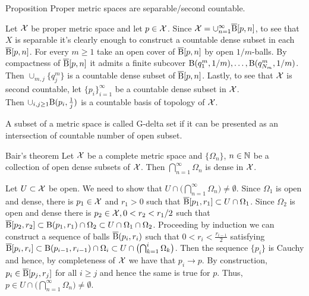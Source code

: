 \begin{thm}{Proposition}
Proper metric spaces are separable/second countable.
\end{thm}
Let $\mathcal{X}$ be  proper metric space and let $p\in \spc{X}$. Since $\spc{X}=\cup_{n=1}^\infty\cBall[p,n]$, to see that $X$ is separable it's clearly enough to construct a countable dense subset in  each $\overline{\mathrm{B}}{}[p,n]$. For every $m\ge 1$  take  an open cover of $\overline{\mathrm{B}}{}[p,n]$ by open $1/m$-balls. By compactness of $\overline{\mathrm{B}}{}[p,n]$ it admits a finite subcover $\mathrm{B}{}(q^m_1,1/m),\ldots, \mathrm{B}{}(q^m_{N_m},1/m)$. Then $\cup_{m, j} \{q^m_j\}$ is a countable dense subset of $\overline{\mathrm{B}}{}[p,n]$.
Lastly, to see that $\mathcal{X}$ is second countable, let $\{p_i\}_{i=1}^\infty$ be a countable dense subset in $\mathcal{X}$. \\ Then $\cup_{i,j\ge 1} \oBall(p_i,\frac 1 j)$ is a countable basis of topology of $\mathcal{X}$.
\qeds




A subset of a metric space is called G-delta set if it can be presented as an intersection of countable number of open subset.

\begin{thm}{Bair's theorem}
Let $\mathcal{X}$ be a complete metric space 
and $\{\Omega_n\}$, $n\in \NN$ be a collection of open dense subsets of $\mathcal{X}$.
Then $\bigcap_{n=1}^\infty\Omega_n$ is dense in $\mathcal{X}$.
\end{thm}

Let $U\subset\spc{X}$ be open. We need to show that $U\cap\bigl(\bigcap_{n=1}^\infty\Omega_n\bigr)\ne\emptyset$. Since $\Omega_1$ is open and dense, there is $p_1\in\spc{X}$ and $r_1>0$ such that $\cBall[p_1,r_1]\subset  U\cap \Omega_1$. Since $\Omega_2$ is open and dense there is $p_2\in\spc{X},0<r_2<r_1/2$ such that $\cBall[p_2,r_2]\subset \oBall(p_1,r_1)\cap \Omega_2\subset U\cap\Omega_1\cap\Omega_2$. Proceeding by induction we can construct a sequence of balls $\overline{\mathrm{B}}{}(p_i,r_i)$ such that $0<r_i<\frac {r_{i-1}}{2}$ satisfying  $\cBall[p_i,r_i]\subset \oBall(p_{i-1},r_{i-1})\cap \Omega_i\subset U\cap \bigl(\bigcap_{k=1}^i\Omega_k
 \bigr)$. Then the sequence $\{p_i\}$ is Cauchy and hence, by completeness of $\mathcal{X}$ we have that $p_i\to p$. By construction, $p_i\in \cBall[p_j,r_j]$ for all $i\ge j$ and hence the same is true for $p$. Thus, $p\in U\cap\bigl(\bigcap_{n=1}^\infty\Omega_n\bigr)\ne\emptyset $. \qeds


